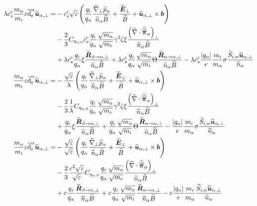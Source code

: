 \begin{align*}
 \lambda c^c_s \frac{m_\a}{m_i} \e \wt{\d}^\a_t\wt{\ve{u}}_{\a,\perp}
 =&
 - c^c_s \sqrt{\e} \L( \frac{q_i}{q_\a} \frac{ \wt{\grad}_\perp \wt{p}_\a }{\wt{n}_\a \wt{B}} + \frac{\wt{\ve{E}}_\perp}{\wt{B}} + \wt{\ve{u}}_{\a,\perp}\times\ve{b} \R)
 \\&
 - \frac{2}{3} C_{\eta_{\a,0}} c^c_s \frac{q_i}{q_\a} \frac{\sqrt{m_\a}}{\sqrt{m_e}} \gamma^2 \zeta \xi \frac{ \L(\wt{\grad}\cdot\wt{\te{\pi}}_\a\R)_\perp }{\wt{n}_\a \wt{B}}
 \\&
 + \lambda c^c_s \frac{q_i}{q_\a} \xi \frac{\wt{\ve{R}}_{\beta \to \a,\perp} }{\wt{n}_\a \wt{B}}
 + \lambda c^c_s\frac{q_i}{q_\a} \frac{\sqrt{m_\a}}{\sqrt{m_i}} \Theta \frac{\wt{\ve{R}}_{n \to \a,\perp} }{\wt{n}_\a  \wt{B}}
 - \lambda c^c_s \frac{|q_\a|}{e} \frac{m_i}{m_\a} \sigma \frac{ \wt{S}_{i,n}\wt{\ve{u}}_{\a,\perp} }{\wt{n}_\a}
 \\
 \frac{m_\a}{m_i} \e \wt{\d}^\a_t\wt{\ve{u}}_{\a,\perp}
 =&
 - \frac{\sqrt{\e}}{\lambda} \L( \frac{q_i}{q_\a} \frac{ \wt{\grad}_\perp \wt{p}_\a }{\wt{n}_\a \wt{B}} + \frac{\wt{\ve{E}}_\perp}{\wt{B}} + \wt{\ve{u}}_{\a,\perp}\times\ve{b} \R)
 \\&
 - \frac{2}{3} \frac{1}{\lambda} C_{\eta_{\a,0}} \frac{q_i}{q_\a} \frac{\sqrt{m_\a}}{\sqrt{m_e}} \gamma^2 \zeta \xi \frac{ \L(\wt{\grad}\cdot\wt{\te{\pi}}_\a\R)_\perp }{\wt{n}_\a \wt{B}}
 \\&
 + \frac{q_i}{q_\a} \xi \frac{\wt{\ve{R}}_{\beta \to \a,\perp} }{\wt{n}_\a \wt{B}}
 + \frac{q_i}{q_\a} \frac{\sqrt{m_\a}}{\sqrt{m_i}} \Theta \frac{\wt{\ve{R}}_{n \to \a,\perp} }{\wt{n}_\a  \wt{B}}
 - \frac{|q_\a|}{e} \frac{m_i}{m_\a} \sigma \frac{ \wt{S}_{i,n}\wt{\ve{u}}_{\a,\perp} }{\wt{n}_\a}
 \\
 \frac{m_\a}{m_i} \e \wt{\d}^\a_t\wt{\ve{u}}_{\a,\perp}
 =&
 - \frac{\sqrt{\e}}{\sqrt{\e}} \L( \frac{q_i}{q_\a} \frac{ \wt{\grad}_\perp \wt{p}_\a }{\wt{n}_\a \wt{B}} + \frac{\wt{\ve{E}}_\perp}{\wt{B}} + \wt{\ve{u}}_{\a,\perp}\times\ve{b} \R)
 \\&
 - \frac{2}{3} \frac{\e^2 \sqrt{\e}}{\sqrt{\e}} C_{\eta_{\a,0}} \frac{q_i}{q_\a} \frac{\sqrt{m_\a}}{\sqrt{m_e}} \frac{ \L(\wt{\grad}\cdot\wt{\te{\pi}}_\a\R)_\perp }{\wt{n}_\a \wt{B}}
 \\&
 +\e \frac{q_i}{q_\a} \frac{\wt{\ve{R}}_{\beta \to \a,\perp} }{\wt{n}_\a \wt{B}}
 +\e \frac{q_i}{q_\a} \frac{\sqrt{m_\a}}{\sqrt{m_i}}  \frac{\wt{\ve{R}}_{n \to \a,\perp} }{\wt{n}_\a  \wt{B}}
 -\e \frac{|q_\a|}{e} \frac{m_i}{m_\a} \frac{ \wt{S}_{i,n}\wt{\ve{u}}_{\a,\perp} }{\wt{n}_\a}

\end{align*}
